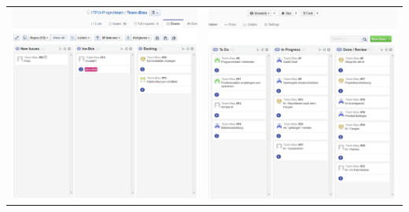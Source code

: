 \begin{landscape}
	\begin{center}
		\begin{tabulary}{1\textwidth}{cc}
			\includegraphics[scale=0.5]{Bilder/ZenHub1.pdf} 
			&
			\includegraphics[scale=0.5]{Bilder/ZenHub2.pdf}\\
		\end{tabulary}
	\end{center}
\end{landscape}